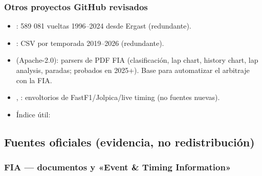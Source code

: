 \subsubsection{Otros proyectos GitHub revisados}

\begin{itemize}
\item {}: 589 081 vueltas 1996–2024 desde Ergast (redundante).
\item {}: CSV por temporada 2019–2026 (redundante).
\item {} (Apache-2.0): parsers de PDF FIA (clasificación, lap chart, history chart, lap analysis, paradas; probados en 2025+). Base para automatizar el arbitraje con la FIA.
\item {}, : envoltorios de FastF1/Jolpica/live timing (no fuentes nuevas).
\item Índice útil: \href{https://github.com/subinium/awesome-f1}{}
\end{itemize}

\subsection{Fuentes oficiales (evidencia, no redistribución)}

\subsubsection{FIA — documentos y «Event \& Timing Information»}

